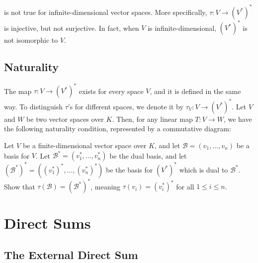 \begin{remark}
   is not true for infinite-dimensional vector spaces. More specifically, $\tau \colon V \to (V^*)^*$ is injective, but not surjective. In fact, when $V$ is infinite-dimensional, $(V^*)^*$ is not isomorphic to $V$.
\end{remark}

\subsection{Naturality}
The map $\tau \colon V \to (V^*)^*$ exists for every space $V$, and it is defined in the same way. To distinguish $\tau$'s for different spaces, we denote it by $\tau_V \colon V \to (V^*)^*$. Let $V$ and $W$ be two vector spaces over $K$. Then, for any linear map $T \colon V \to W$, we have the following naturality condition, represented by a commutative diagram:

\begin{center}
\end{center}

\begin{exercise}
  Let $V$ be a finite-dimensional vector space over $K$, and let $\mathcal{B} = (v_1, \dots, v_n)$ be a basis for $V$. Let $\mathcal{B}^* = (v_1^*, \dots, v_n^*)$ be the dual basis, and let $(\mathcal{B}^*)^* = ((v_1^*)^*, \dots, (v_n^*)^*)$ be the basis for $(V^*)^*$ which is dual to $\mathcal{B}^*$. Show that $\tau(\mathcal{B}) = (\mathcal{B}^*)^*$, meaning $\tau(v_i) = (v_i^*)^*$ for all $1 \leq i \leq n$.
\end{exercise}

\setcounter{section}{1}
\section{Direct Sums}

\subsection{The External Direct Sum}

